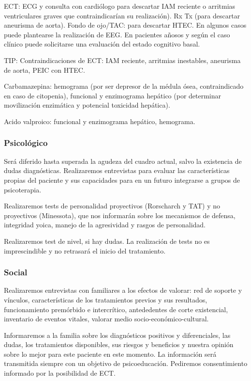 ECT: ECG y consulta con cardiólogo para descartar IAM reciente o arritmias ventriculares graves que contraindicarían su realización). Rx Tx (para descartar aneurisma de aorta). Fondo de ojo/TAC: para descartar HTEC. En algunos casos puede plantearse la realización de EEG. En pacientes añosos y según el caso clínico puede solicitarse una evaluación del estado cognitivo basal.

TIP: Contraindicaciones de ECT: IAM reciente, arritmias inestables, aneurisma de aorta, PEIC con HTEC.

Carbamazepina: hemograma (por ser depresor de la médula ósea, contraindicado en caso de citopenia), funcional y enzimograma hepático (por determinar movilización enzimática y potencial toxicidad hepática).

Acido valproico: funcional y enzimograma hepático, hemograma.
\subsubsection*{Psicológico}
Será diferido hasta superada la agudeza del cuadro actual, salvo la existencia de dudas diagnósticas. Realizaremos entrevistas para evaluar las características propias del paciente y sus capacidades para en un futuro integrarse a grupos de psicoterapia.

Realizaremos tests de personalidad proyectivos (Rorscharch y TAT) y no proyectivos (Minessota), que nos informarán sobre los mecanismos de defensa, integridad yoica, manejo de la agresividad y rasgos de personalidad.

Realizaremos test de nivel, si hay dudas. La realización de tests no es imprescindible y no retrasará el inicio del tratamiento.
\subsubsection*{Social}
Realizaremos entrevistas con familiares a los efectos de valorar: red de soporte y vínculos, características de los tratamientos previos y sus resultados, funcionamiento premórbido e intercrítico, antededentes de corte existencial, inventario de eventos vitales, valorar medio socio-económico-cultural.

Informaremos a la familia sobre los diagnósticos positivos y diferenciales, las dudas, los tratamientos disponibles, sus riesgos y beneficios y nuestra opinión sobre lo mejor para este paciente en este momento. La información será transmitida siempre con un objetivo de psicoeducación. Pediremos consentimiento informado por la posibilidad de ECT.
